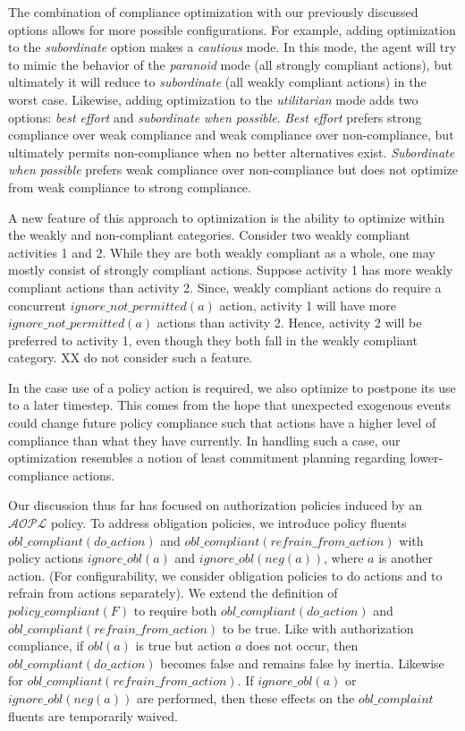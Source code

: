 The combination of compliance optimization with our previously discussed options allows for more possible configurations.
For example, adding optimization to the \textit{subordinate} option makes a \textit{cautious} mode.
In this mode, the agent will try to mimic the behavior of the \textit{paranoid} mode (all strongly compliant actions), but ultimately it will reduce to \textit{subordinate} (all weakly compliant actions) in the worst case.
Likewise, adding optimization to the \textit{utilitarian} mode adds two options: \textit{best effort} and \textit{subordinate when possible}.
\textit{Best effort} prefers strong compliance over weak compliance and weak compliance over non-compliance, but ultimately permits non-compliance when no better alternatives exist.
\textit{Subordinate when possible} prefers weak compliance over non-compliance but does not optimize from weak compliance to strong compliance.

A new feature of this approach to optimization is the ability to optimize within the weakly and non-compliant categories.
Consider two weakly compliant activities 1 and 2.
While they are both weakly compliant as a whole, one may mostly consist of strongly compliant actions.
Suppose activity 1 has more weakly compliant actions than activity 2.
Since, weakly compliant actions do require a concurrent $ignore\_not\_permitted(a)$ action, activity 1 will have more $ignore\_not\_permitted(a)$ actions than activity 2.
Hence, activity 2 will be preferred to activity 1, even though they both fall in the weakly compliant category.
XX do not consider such a feature.

In the case use of a policy action is required, we also optimize to postpone its use to a later timestep.
This comes from the hope that unexpected exogenous events could change future policy compliance such that actions have a higher level of compliance than what they have currently.
In handling such a case, our optimization resembles a notion of least commitment planning regarding lower-compliance actions.

Our discussion thus far has focused on authorization policies induced by an $\mathcal{AOPL}$ policy.
To address obligation policies, we introduce policy fluents $obl\_compliant(do\_action)$ and $obl\_compliant(refrain\_from\_action)$ with policy actions $ignore\_obl(a)$ and $ignore\_obl(neg(a))$, where $a$ is another action.
(For configurability, we consider obligation policies to do actions and to refrain from actions separately).
We extend the definition of $policy\_compliant(F)$ to require both $obl\_compliant(do\_action)$ and $obl\_compliant(refrain\_from\_action)$ to be true.
Like with authorization compliance, if $obl(a)$ is true but action $a$ does not occur, then $obl\_compliant(do\_action)$ becomes false and remains false by inertia.
Likewise for $obl\_compliant(refrain\_from\_action)$.
If $ignore\_obl(a)$ or $ignore\_obl(neg(a))$ are performed, then these effects on the $obl\_complaint$ fluents are temporarily waived.

